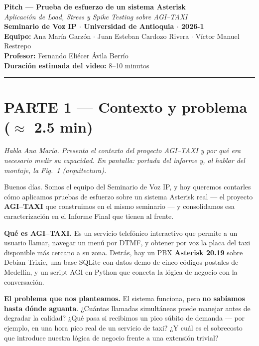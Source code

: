 \documentclass[11pt]{article}
\newcommand{\cue}[1]{%
  \begin{tcolorbox}[colback=blockbg,colframe=blockbg,boxrule=0pt,arc=2pt,left=8pt,right=8pt,top=4pt,bottom=4pt]
    \footnotesize\itshape\color{muted}#1
  \end{tcolorbox}%
}
\begin{document}
\begin{center}
{\Large\bfseries Pitch --- Prueba de esfuerzo de un sistema Asterisk}\\[2pt]
{\large \textit{Aplicaci\'on de Load, Stress y Spike Testing sobre AGI--TAXI}}\\[10pt]

\textbf{Seminario de Voz IP $\cdot$ Universidad de Antioquia $\cdot$ 2026-1}\\[2pt]
\textbf{Equipo:} Ana Mar\'ia Garz\'on $\cdot$ Juan Esteban Cardozo Rivera $\cdot$ V\'ictor Manuel Restrepo\\[2pt]
\textbf{Profesor:} Fernando Eli\'ecer \'Avila Berr\'io\\[2pt]
\textbf{Duraci\'on estimada del video:} 8--10 minutos
\end{center}

\vspace{6pt}\hrule\vspace{12pt}

\section*{PARTE 1 --- Contexto y problema ($\approx$ 2.5 min)}

\cue{Habla Ana Mar\'ia. Presenta el contexto del proyecto AGI--TAXI y por qu\'e era necesario medir su capacidad. En pantalla: portada del informe y, al hablar del montaje, la Fig.~1 (arquitectura).}

\noindent Buenos d\'ias. Somos el equipo del Seminario de Voz IP, y hoy queremos contarles c\'omo aplicamos pruebas de esfuerzo sobre un sistema Asterisk real --- el proyecto \textbf{AGI--TAXI} que construimos en el mismo seminario --- y consolidamos esa caracterizaci\'on en el Informe Final que tienen al frente.

\medskip
\textbf{Qu\'e es AGI--TAXI.} Es un servicio telef\'onico interactivo que permite a un usuario llamar, navegar un men\'u por DTMF, y obtener por voz la placa del taxi disponible m\'as cercano a su zona. Detr\'as, hay un PBX \textbf{Asterisk 20.19} sobre Debian Trixie, una base SQLite con datos demo de cinco c\'odigos postales de Medell\'in, y un script AGI en Python que conecta la l\'ogica de negocio con la conversaci\'on.

\medskip
\textbf{El problema que nos planteamos.} El sistema funciona, pero \textbf{no sab\'iamos hasta d\'onde aguanta}. ¿Cu\'antas llamadas simult\'aneas puede manejar antes de degradar la calidad? ¿Qu\'e pasa si recibimos un pico s\'ubito de demanda --- por ejemplo, en una hora pico real de un servicio de taxi? ¿Y cu\'al es el sobrecosto que introduce nuestra l\'ogica de negocio frente a una extensi\'on trivial?
\end{document}
